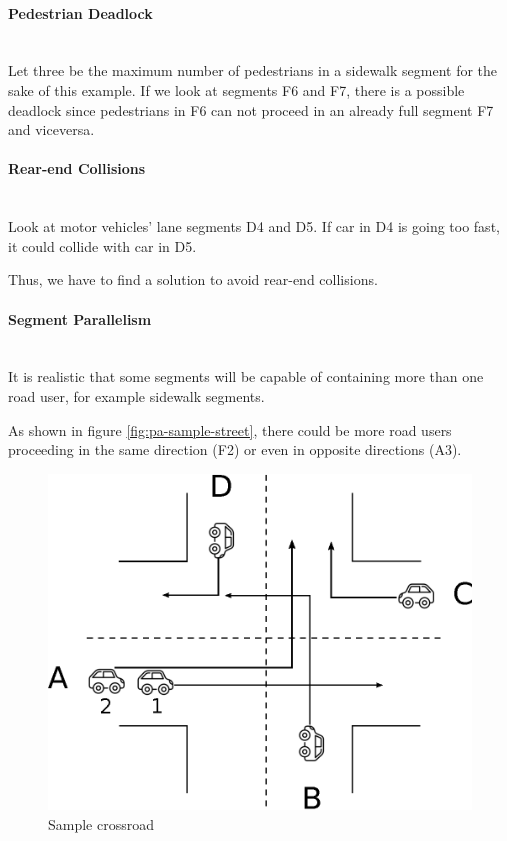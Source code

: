 \paragraph{Pedestrian Deadlock} \mbox{} \\

Let three be the maximum number of pedestrians in a sidewalk segment for the
sake of this example.
If we look at segments F6 and F7, there is a possible deadlock since
pedestrians in F6 can not proceed in an already full segment F7 and viceversa.

\paragraph{Rear-end Collisions} \mbox{} \\

Look at motor vehicles' lane segments D4 and D5. If car in D4 is going too
fast, it could collide with car in D5.

Thus, we have to find a solution to avoid rear-end collisions.

\paragraph{Segment Parallelism} \mbox{} \\

It is realistic that some segments will be capable of containing more than one
road user, for example sidewalk segments.

As shown in figure \ref{fig:pa-sample-street}, there could be more road users
proceeding in the same direction (F2) or even in opposite directions (A3).

\begin{figure}[H]
  \centering
  \includegraphics[width=.6\columnwidth]{images/analysis/crossroads.eps}
  \caption{Sample crossroad}
  \label{fig:pa-sample-crossroad}
\end{figure}

